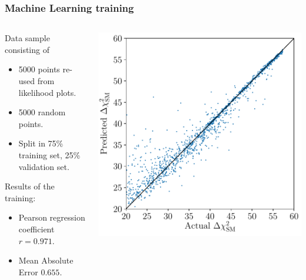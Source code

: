 \documentclass[mathserif, 10pt]{beamer}
\begin{document}
\begin{frame}
    \frametitle{Machine Learning training}

    \begin{columns}
        \begin{column}{0.5\textwidth}
            Data sample consisting of
            \begin{itemize}
                \item 5000 points re-used from likelihood plots.
                \item 5000 random points.
                \item Split in 75\% training set, 25\% validation set.
            \end{itemize}
            Results of the training:
            \begin{itemize}
                \item Pearson regression coefficient $r=0.971$.
                \item Mean Absolute Error $0.655$.
            \end{itemize}
        \end{column}
        \begin{column}{0.5\textwidth}
            \includegraphics[width=\columnwidth]{figures/regression_xgb.pdf}
        \end{column}
    \end{columns}
    

\end{frame}
\end{document}
